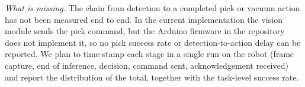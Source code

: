 \noindent\textit{What is missing.} The chain from detection to a completed pick or vacuum action has not been measured end to end. In the current implementation the vision module sends the pick command, but the Arduino firmware in the repository does not implement it, so no pick success rate or detection-to-action delay can be reported. We plan to time-stamp each stage in a single run on the robot (frame capture, end of inference, decision, command sent, acknowledgement received) and report the distribution of the total, together with the task-level success rate.
